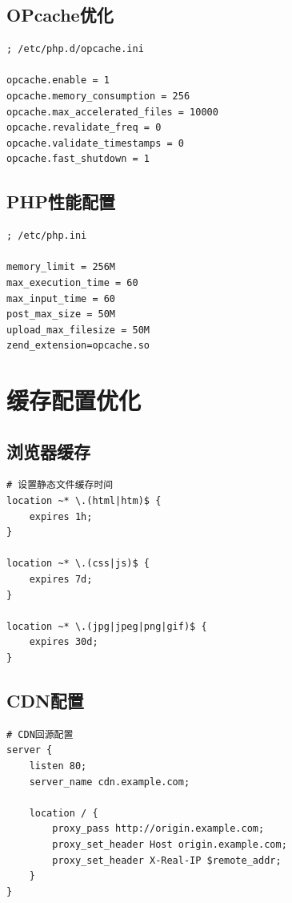\documentclass[12pt,UTF8]{ctexbook}
\begin{document}
\subsection*{OPcache优化}

\begin{lstlisting}
; /etc/php.d/opcache.ini

opcache.enable = 1
opcache.memory_consumption = 256
opcache.max_accelerated_files = 10000
opcache.revalidate_freq = 0
opcache.validate_timestamps = 0
opcache.fast_shutdown = 1
\end{lstlisting}

\subsection*{PHP性能配置}

\begin{lstlisting}
; /etc/php.ini

memory_limit = 256M
max_execution_time = 60
max_input_time = 60
post_max_size = 50M
upload_max_filesize = 50M
zend_extension=opcache.so
\end{lstlisting}

\section{缓存配置优化}
\label{sec:cache-optimization}

\subsection*{浏览器缓存}

\begin{lstlisting}
# 设置静态文件缓存时间
location ~* \.(html|htm)$ {
    expires 1h;
}

location ~* \.(css|js)$ {
    expires 7d;
}

location ~* \.(jpg|jpeg|png|gif)$ {
    expires 30d;
}
\end{lstlisting}

\subsection*{CDN配置}

\begin{lstlisting}
# CDN回源配置
server {
    listen 80;
    server_name cdn.example.com;

    location / {
        proxy_pass http://origin.example.com;
        proxy_set_header Host origin.example.com;
        proxy_set_header X-Real-IP $remote_addr;
    }
}
\end{lstlisting}
\end{document}
